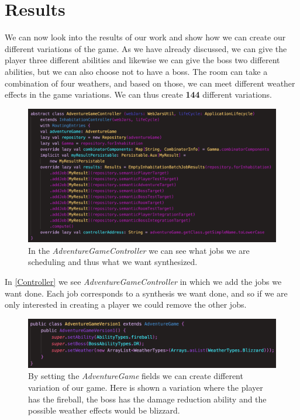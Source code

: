 \section{Results}
We can now look into the results of our work and show how we can create our different variations of the game. As we have already discussed, we can give the player three different abilities and likewise we can give the boss two different abilities, but we can also choose not to have a boss. The room can take a combination of four weathers, and based on those, we can meet different weather effects in the game variations. We can thus create \textbf{144} different variations.

\begin{figure}[H]
	\centering
	\includegraphics[width=\linewidth]{Materials/Results/AdventureController}
	\caption{In the \textit{AdventureGameController} we can see what jobs we are scheduling and thus what we want synthesized.}
	\label{Controller}
\end{figure}
In \autoref{Controller} we see \textit{AdventureGameController} in which we add the jobs we want done. Each job corresponds to a synthesis we want done, and so if we are only interested in creating a player we could remove the other jobs.

\begin{figure}[H]
	\centering
	\includegraphics[width=\linewidth]{Materials/Results/AdventureVariation}
	\caption{By setting the \textit{AdventureGame} fields we can create different variation of our game. Here is shown a variation where the player has the fireball, the boss has the damage reduction ability and the possible weather effects would be blizzard.}
	\label{version1}
\end{figure}

